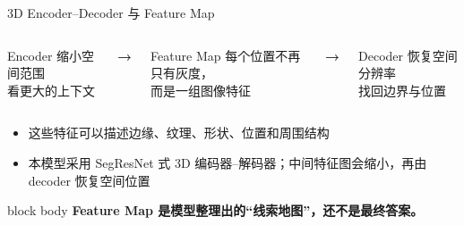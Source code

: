 \documentclass[aspectratio=169,12pt]{beamer}
\newcommand{\takeaway}[1]{%
  \begin{beamercolorbox}[wd=\linewidth,sep=.16cm,center,rounded=true,shadow=true]{block body}
    \textcolor{BeamerDeep}{\textbf{#1}}
  \end{beamercolorbox}
}
\newcommand{\bigarrow}{\textcolor{BeamerRoyal}{\large\bfseries →}}
\begin{document}
\begin{frame}{3D Encoder--Decoder 与 Feature Map}
  \begin{columns}[c,onlytextwidth]
      \begin{block}{Encoder}
        \centering
        缩小空间范围\\
        看更大的上下文
      \end{block}
    \centering\bigarrow
      \begin{block}{Feature Map}
        \centering
        每个位置不再只有灰度，\\
        而是一组图像特征
      \end{block}
    \centering\bigarrow
      \begin{block}{Decoder}
        \centering
        恢复空间分辨率\\
        找回边界与位置
      \end{block}
  \end{columns}

  \vspace{0.18cm}
  \begin{itemize}
    \item 这些特征可以描述边缘、纹理、形状、位置和周围结构
    \item 本模型采用 SegResNet 式 3D 编码器--解码器；中间特征图会缩小，再由 decoder 恢复空间位置
  \end{itemize}
  \vfill
  \takeaway{{\fontsize{11.8}{15.2}\selectfont
    Feature Map 是模型整理出的“线索地图”，还不是最终答案。}}
\end{frame}
\end{document}
